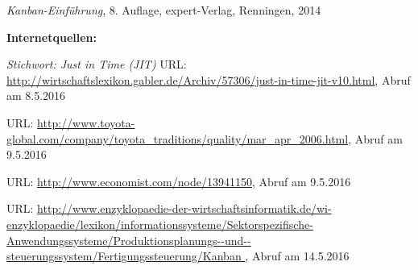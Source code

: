 \begin{thebibliography}{}
	 {\sl Kanban-Einführung}, 8. Auflage, expert-Verlag, Renningen, 2014
	
	
	\textbf{Internetquellen:}

	 {\sl Stichwort: Just in Time (JIT)} URL: \url{http://wirtschaftslexikon.gabler.de/Archiv/57306/just-in-time-jit-v10.html}, Abruf am 8.5.2016

	 URL: \url{	http://www.toyota-global.com/company/toyota_traditions/quality/mar_apr_2006.html}, Abruf am 9.5.2016
	
	 URL: \url{http://www.economist.com/node/13941150}, Abruf am 9.5.2016
	
	

	
	 URL: \url{	http://www.enzyklopaedie-der-wirtschaftsinformatik.de/wi-enzyklopaedie/lexikon/informationssysteme/Sektorspezifische-Anwendungssysteme/Produktionsplanungs--und--steuerungssystem/Fertigungssteuerung/Kanban
}, Abruf am 14.5.2016

	
	 
  \end{thebibliography}
